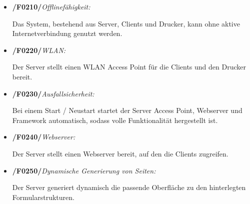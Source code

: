    \begin{itemize}
        \item \textbf{/F0210/}\textit{Offlinefähigkeit:} \par
        Das System, bestehend aus Server, Clients und Drucker, kann ohne aktive Internetverbindung genutzt werden.
        
        \item \textbf{/F0220/}\textit{WLAN:} \par
        Der Server stellt einen WLAN Access Point für die Clients und den Drucker bereit.
        
        \item \textbf{/F0230/}\textit{Ausfallsicherheit:} \par
        Bei einem Start / Neustart startet der Server Access Point, Webserver und Framework automatisch, sodass volle Funktionalität hergestellt ist.
        
        \item \textbf{/F0240/}\textit{Webserver:} \par
        Der Server stellt einen Webserver bereit, auf den die Clients zugreifen.
        
        \item \textbf{/F0250/}\textit{Dynamische Generierung von Seiten:} \par
        Der Server generiert dynamisch die passende Oberfläche zu den hinterlegten Formularstrukturen.
    \end{itemize}